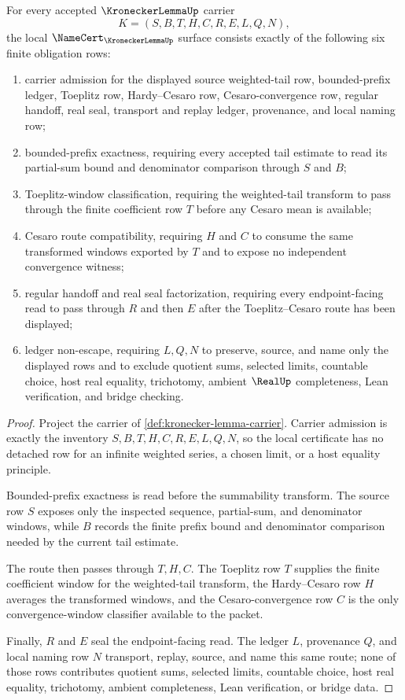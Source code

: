 \begin{theorem}\label{thm:kronecker-lemma-namecert-obligations}
For every accepted $\KroneckerLemmaUp$ carrier
$$
K=(S,B,T,H,C,R,E,L,Q,N),
$$
the local $\NameCert_{\KroneckerLemmaUp}$ surface consists exactly of the following six finite obligation rows:
\begin{enumerate}
\item carrier admission for the displayed source weighted-tail row, bounded-prefix ledger, Toeplitz row, Hardy--Cesaro row, Cesaro-convergence row, regular handoff, real seal, transport and replay ledger, provenance, and local naming row;
\item bounded-prefix exactness, requiring every accepted tail estimate to read its partial-sum bound and denominator comparison through $S$ and $B$;
\item Toeplitz-window classification, requiring the weighted-tail transform to pass through the finite coefficient row $T$ before any Cesaro mean is available;
\item Cesaro route compatibility, requiring $H$ and $C$ to consume the same transformed windows exported by $T$ and to expose no independent convergence witness;
\item regular handoff and real seal factorization, requiring every endpoint-facing read to pass through $R$ and then $E$ after the Toeplitz--Cesaro route has been displayed;
\item ledger non-escape, requiring $L,Q,N$ to preserve, source, and name only the displayed rows and to exclude quotient sums, selected limits, countable choice, host real equality, trichotomy, ambient $\RealUp$ completeness, Lean verification, and bridge checking.
\end{enumerate}
\end{theorem}
\begin{proof}
Project the carrier of \autoref{def:kronecker-lemma-carrier}. Carrier admission is exactly the inventory $S,B,T,H,C,R,E,L,Q,N$, so the local certificate has no detached row for an infinite weighted series, a chosen limit, or a host equality principle.

Bounded-prefix exactness is read before the summability transform. The source row $S$ exposes only the inspected sequence, partial-sum, and denominator windows, while $B$ records the finite prefix bound and denominator comparison needed by the current tail estimate.

The route then passes through $T,H,C$. The Toeplitz row $T$ supplies the finite coefficient window for the weighted-tail transform, the Hardy--Cesaro row $H$ averages the transformed windows, and the Cesaro-convergence row $C$ is the only convergence-window classifier available to the packet.

Finally, $R$ and $E$ seal the endpoint-facing read. The ledger $L$, provenance $Q$, and local naming row $N$ transport, replay, source, and name this same route; none of those rows contributes quotient sums, selected limits, countable choice, host real equality, trichotomy, ambient completeness, Lean verification, or bridge data.
\end{proof}

